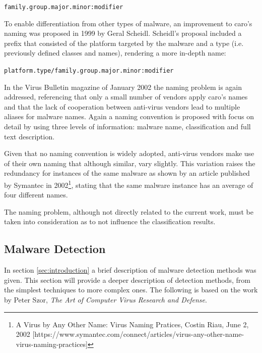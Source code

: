 \documentclass{llncs}
\begin{document}
\begin{center}\texttt{family.group.major.minor:modifier}\end{center}

To enable differentiation from other types of malware, an improvement to \gls{caro}'s naming was proposed in 1999 by Geral Scheidl\cite{scheidl:naming}. Scheidl's proposal included a prefix that consisted of the platform targeted by the malware and a type (i.e. previously defined classes and names), rendering a more in-depth name:

\begin{center}\texttt{platform.type/family.group.major.minor:modifier}\end{center}

In the Virus Bulletin magazine of January 2002\cite{virus_bulletin} the naming problem is again addressed, referencing that only a small number of vendors apply \gls{caro}'s names and that the lack of cooperation between anti-virus vendors lead to multiple aliases for malware names. Again a naming convention is proposed with focus on detail by using three levels of information: malware name, classification and full text description.

Given that no naming convention is widely adopted, anti-virus vendors make use of their own naming that although similar, vary slightly. This variation raises the redundancy for instances of the same malware as shown by an article published by Symantec in 2002\footnote{A Virus by Any Other Name: Virus Naming Pratices, Costin Riau, June 2, 2002 [https://www.symantec.com/connect/articles/virus-any-other-name-virus-naming-practices]}, stating that the same malware instance has an average of four different names.

The naming problem, although not directly related to the current work, must be taken into consideration as to not influence the classification results.

\subsection{Malware Detection}\label{subsec:mal_detec}

In section \ref{sec:introduction} a brief description of malware detection methods was given. This section will provide a deeper description of detection methods, from the simplest techniques to more complex ones. The following is based on the work by Peter Szor, \textit{The Art of Computer Virus Research and Defense}\cite{szor:art}.
\end{document}

